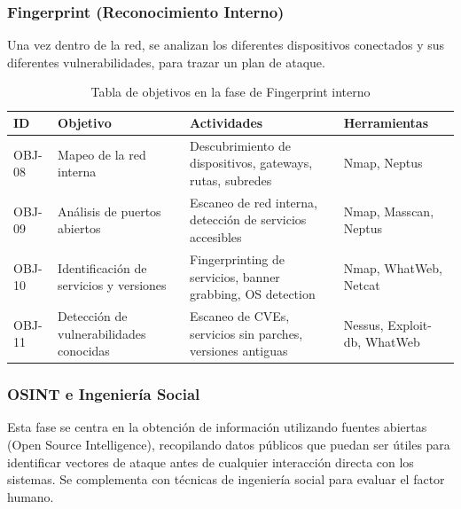 \documentclass[a4paper, 11pt]{article}
\begin{document}
\par\vspace{0.5cm}






\subsubsection{Fingerprint (Reconocimiento Interno)}

Una vez dentro de la red, se analizan los diferentes dispositivos conectados y sus diferentes vulnerabilidades, para trazar un plan de ataque.

\begin{table}[H]
\centering
\renewcommand{\arraystretch}{1.4}
    \begin{tabular}{|p{1.4cm}|p{3.9cm}|p{5.3cm}|p{4.2cm}|}
\hline
\textbf{ID} & \textbf{Objetivo} & \textbf{Actividades} & \textbf{Herramientas}  \\
\hline
OBJ-08 & Mapeo de la red interna & Descubrimiento de dispositivos, gateways, rutas, subredes & Nmap, Neptus  \\
\hline
OBJ-09 & Análisis de puertos abiertos & Escaneo de red interna, detección de servicios accesibles & Nmap, Masscan, Neptus  \\
\hline
OBJ-10 & Identificación de servicios y versiones & Fingerprinting de servicios, banner grabbing, OS detection & Nmap, WhatWeb, Netcat  \\
\hline
OBJ-11 & Detección de vulnerabilidades conocidas & Escaneo de CVEs, servicios sin parches, versiones antiguas & Nessus, Exploit-db, WhatWeb  \\
\hline

\end{tabular}
\caption{Tabla de objetivos en la fase de Fingerprint interno}
\end{table}


\par\vspace{0.5cm}



\subsubsection{OSINT e Ingeniería Social}

Esta fase se centra en la obtención de información utilizando fuentes abiertas (Open Source Intelligence), recopilando datos públicos que puedan ser útiles para identificar vectores de ataque antes de cualquier interacción directa con los sistemas. Se complementa con técnicas de ingeniería social para evaluar el factor humano.
\end{document}
